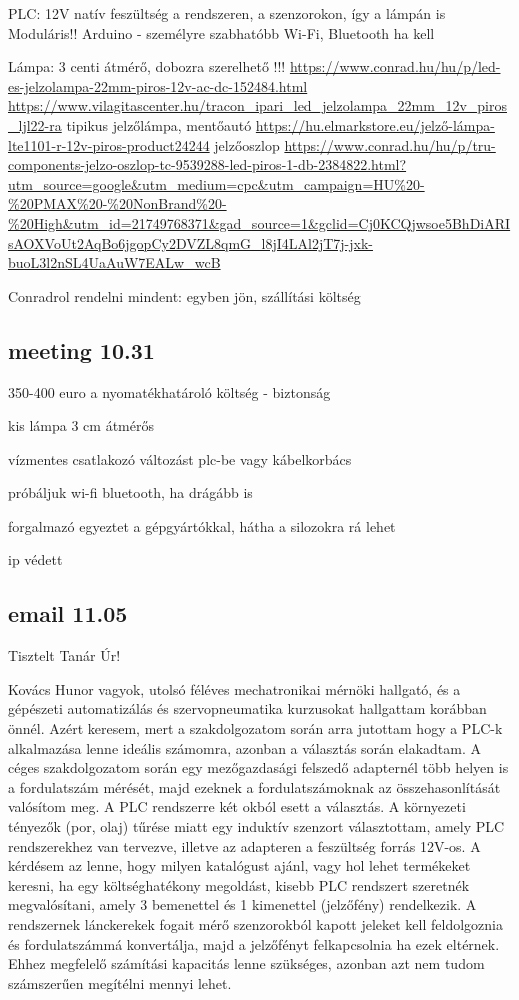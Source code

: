 \documentclass{article}
\begin{document}
	PLC: 12V
	natív feszültség a rendszeren, a szenzorokon, így a lámpán is
	Moduláris!!
	Arduino - személyre szabhatóbb
	Wi-Fi, Bluetooth ha kell
	
	Lámpa:
	3 centi átmérő, dobozra szerelhető !!!
	\url{https://www.conrad.hu/hu/p/led-es-jelzolampa-22mm-piros-12v-ac-dc-152484.html}
	\url{https://www.vilagitascenter.hu/tracon_ipari_led_jelzolampa_22mm_12v_piros_ljl22-ra}
	tipikus jelzőlámpa, mentőautó 
	\url{https://hu.elmarkstore.eu/jelző-lámpa-lte1101-r-12v-piros-product24244}
	jelzőoszlop \url{https://www.conrad.hu/hu/p/tru-components-jelzo-oszlop-tc-9539288-led-piros-1-db-2384822.html?utm_source=google&utm_medium=cpc&utm_campaign=HU%20-%20PMAX%20-%20NonBrand%20-%20High&utm_id=21749768371&gad_source=1&gclid=Cj0KCQjwsoe5BhDiARIsAOXVoUt2AqBo6jgopCy2DVZL8qmG_l8jI4LAl2jT7j-jxk-buoL3l2nSL4UaAuW7EALw_wcB}
	
	Conradrol rendelni mindent: egyben jön, szállítási költség	
	
	\subsection{meeting 10.31}
	
	350-400 euro a nyomatékhatároló
	költség - biztonság
	
	kis lámpa 3 cm átmérős 
	
	vízmentes csatlakozó változást
	plc-be vagy kábelkorbács
	
	próbáljuk wi-fi bluetooth, ha drágább is
	
	forgalmazó egyeztet a gépgyártókkal, hátha a silozokra rá lehet
	
	ip védett
	
	\subsection{email 11.05}
	
	Tisztelt Tanár Úr!
	
	Kovács Hunor vagyok, utolsó féléves mechatronikai mérnöki hallgató, és a gépészeti automatizálás és szervopneumatika kurzusokat hallgattam korábban önnél. Azért keresem, mert a szakdolgozatom során arra jutottam hogy a PLC-k alkalmazása lenne ideális számomra, azonban a választás során elakadtam.
	A céges szakdolgozatom során egy mezőgazdasági felszedő adapternél több helyen is a fordulatszám mérését, majd ezeknek a fordulatszámoknak az összehasonlítását valósítom meg. A PLC rendszerre két okból esett a választás. A környezeti tényezők (por, olaj) tűrése miatt egy induktív szenzort választottam, amely PLC rendszerekhez van tervezve, illetve az adapteren a feszültség forrás 12V-os.
	A kérdésem az lenne, hogy milyen katalógust ajánl, vagy hol lehet termékeket keresni, ha egy költséghatékony megoldást, kisebb PLC rendszert szeretnék megvalósítani, amely 3 bemenettel és 1 kimenettel (jelzőfény) rendelkezik. 
	A rendszernek lánckerekek fogait mérő szenzorokból kapott jeleket kell feldolgoznia és fordulatszámmá konvertálja, majd a jelzőfényt felkapcsolnia ha ezek eltérnek. Ehhez megfelelő számítási kapacitás lenne szükséges, azonban azt nem tudom számszerűen megítélni mennyi lehet.
\end{document}
